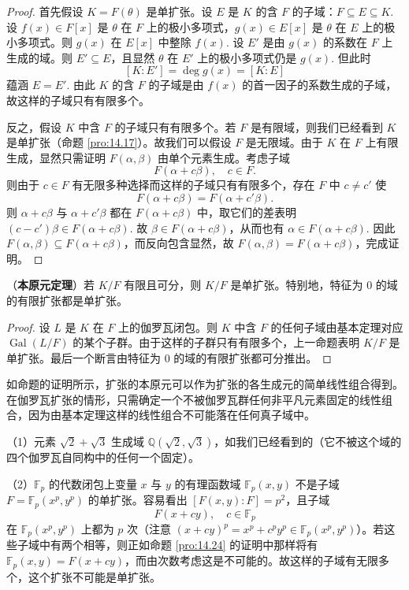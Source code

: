 \begin{proof}
首先假设 \(K = F(\theta)\) 是单扩张。设 \(E\) 是 \(K\) 的含 \(F\) 的子域：\(F \subseteq E \subseteq K\). 设 \(f(x) \in F[x]\) 是 \(\theta\) 在 \(F\) 上的极小多项式，\(g(x) \in E[x]\) 是 \(\theta\) 在 \(E\) 上的极小多项式。则 \(g(x)\) 在 \(E[x]\) 中整除 \(f(x)\). 设 \(E'\) 是由 \(g(x)\) 的系数在 \(F\) 上生成的域。则 \(E' \subseteq E\)，且显然 \(\theta\) 在 \(E'\) 上的极小多项式仍是 \(g(x)\). 但此时
\[
[K:E'] = \deg g(x) = [K:E]
\]
蕴涵 \(E = E'\). 由此 \(K\) 的含 \(F\) 的子域是由 \(f(x)\) 的首一因子的系数生成的子域，故这样的子域只有有限多个。

反之，假设 \(K\) 中含 \(F\) 的子域只有有限多个。若 \(F\) 是有限域，则我们已经看到 \(K\) 是单扩张（命题 \ref{pro:14.17}）。故我们可以假设 \(F\) 是无限域。由于 \(K\) 在 \(F\) 上有限生成，显然只需证明 \(F(\alpha, \beta)\) 由单个元素生成。考虑子域
\[
F(\alpha+c\beta), \quad c \in F.
\]
则由于 \(c \in F\) 有无限多种选择而这样的子域只有有限多个，存在 \(F\) 中 \(c \neq c'\) 使
\[
F(\alpha+c\beta) = F(\alpha+c'\beta).
\]
则 \(\alpha+c\beta\) 与 \(\alpha+c'\beta\) 都在 \(F(\alpha+c\beta)\) 中，取它们的差表明 \((c-c')\beta \in F(\alpha+c\beta)\). 故 \(\beta \in F(\alpha+c\beta)\)，从而也有 \(\alpha \in F(\alpha+c\beta)\). 因此 \(F(\alpha, \beta) \subseteq F(\alpha+c\beta)\)，而反向包含显然，故 \(F(\alpha, \beta) = F(\alpha+c\beta)\)，完成证明。
\end{proof}

\begin{theorem}\label{thm:14.25}
（\textbf{本原元定理}）若 \(K/F\) 有限且可分，则 \(K/F\) 是单扩张。特别地，特征为 0 的域的有限扩张都是单扩张。
\end{theorem}

\begin{proof}
设 \(L\) 是 \(K\) 在 \(F\) 上的伽罗瓦闭包。则 \(K\) 中含 \(F\) 的任何子域由基本定理对应 \(\operatorname{Gal}(L/F)\) 的某个子群。由于这样的子群只有有限多个，上一命题表明 \(K/F\) 是单扩张。最后一个断言由特征为 0 的域的有限扩张都可分推出。
\end{proof}

如命题的证明所示，扩张的本原元可以作为扩张的各生成元的简单线性组合得到。在伽罗瓦扩张的情形，只需确定一个不被伽罗瓦群任何非平凡元素固定的线性组合，因为由基本定理这样的线性组合不可能落在任何真子域中。

\begin{example}
（1）元素 \(\sqrt{2}+\sqrt{3}\) 生成域 \(\mathbb{Q}(\sqrt{2}, \sqrt{3})\)，如我们已经看到的（它不被这个域的四个伽罗瓦自同构中的任何一个固定）。

（2）\(\mathbb{F}_p\) 的代数闭包上变量 \(x\) 与 \(y\) 的有理函数域 \(\mathbb{F}_p(x, y)\) 不是子域 \(F = \mathbb{F}_p(x^p, y^p)\) 的单扩张。容易看出 \([F(x,y):F] = p^2\)，且子域
\[
F(x+cy), \quad c \in \mathbb{F}_p
\]
在 \(\mathbb{F}_p(x^p, y^p)\) 上都为 \(p\) 次（注意 \((x+cy)^p = x^p+c^py^p \in \mathbb{F}_p(x^p, y^p)\)）。若这些子域中有两个相等，则正如命题 \ref{pro:14.24} 的证明中那样将有 \(\mathbb{F}_p(x, y) = F(x+cy)\)，而由次数考虑这是不可能的。故这样的子域有无限多个，这个扩张不可能是单扩张。
\end{example}

